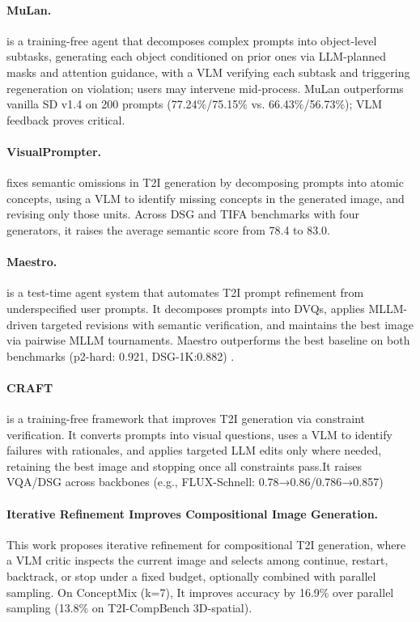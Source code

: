 \paragraph{MuLan.}
 is a training-free agent that decomposes complex prompts into object-level subtasks, generating each object conditioned on prior ones via LLM-planned masks and attention guidance, with a VLM verifying each subtask and triggering regeneration on violation; users may intervene mid-process. MuLan outperforms vanilla SD v1.4 on 200 prompts (77.24\%/75.15\% vs. 66.43\%/56.73\%); VLM feedback proves critical.~\cite{li2025mulan}

\paragraph{VisualPrompter.}
 fixes semantic omissions in T2I generation by decomposing prompts into atomic concepts, using a VLM to identify missing concepts in the generated image, and revising only those units. Across DSG and TIFA benchmarks with four generators, it raises the average semantic score from 78.4 to 83.0.~\cite{wu2026visualprompter}

\paragraph{Maestro.}
 is a test-time agent system that automates T2I prompt refinement from underspecified user prompts. It decomposes prompts into DVQs, applies MLLM-driven targeted revisions with semantic verification, and maintains the best image via pairwise MLLM tournaments. Maestro outperforms the best baseline on both benchmarks (p2-hard: 0.921,   DSG-1K:0.882) .~\cite{avg250910704}

\paragraph{CRAFT}
 is a training-free framework that improves T2I generation via constraint verification. It converts prompts into visual questions, uses a VLM to identify failures with rationales, and applies targeted LLM edits only where needed, retaining the best image and stopping once all constraints pass.It raises VQA/DSG across backbones (e.g., FLUX-Schnell: 0.78→0.86/0.786→0.857)~\cite{kovalev2025craft}

\paragraph{Iterative Refinement Improves Compositional Image Generation.}
This work proposes iterative refinement for compositional T2I generation, where a VLM critic inspects the current image and selects among continue, restart, backtrack, or stop under a fixed budget, optionally combined with parallel sampling. On ConceptMix (k=7), It improves accuracy by 16.9\% over parallel sampling (13.8\% on T2I-CompBench 3D-spatial).

